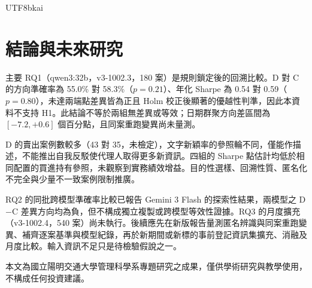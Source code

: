\documentclass[12pt,a4paper]{article}
\newcommand{\grp}[1]{\textsf{#1}}
\begin{document}
\begin{CJK}{UTF8}{bkai}
\section{結論與未來研究}
\label{sec:conclusion}

主要 RQ1（qwen3:32b，v3-1002.3，180 案）是規則鎖定後的回溯比較。\grp{D} 對 \grp{C} 的方向準確率為 55.0\% 對 58.3\%（$p=0.21$）、年化 Sharpe 為 0.54 對 0.59（$p=0.80$），未達兩端點差異皆為正且 Holm 校正後顯著的優越性判準，因此本資料不支持 H1。此結論不等於兩組無差異或等效；日期群聚方向差區間為 $[-7.2,+0.6]$ 個百分點，且同案重跑變異尚未量測。

\grp{D} 的賣出案例數較多（43 對 35，未檢定），文字新穎率的參照輪不同，僅能作描述，不能推出自我反駁使代理人取得更多新資訊。四組的 Sharpe 點估計均低於相同配置的買進持有參照，未觀察到實務績效增益。目的性選樣、回溯性質、匿名化不完全與少量不一致案例限制推廣。

RQ2 的同批跨模型準確率比較已報告 Gemini 3 Flash 的探索性結果，兩模型之 \grp{D}$-$\grp{C} 差異方向均為負，但不構成獨立複製或跨模型等效性證據。RQ3 的月度擴充（v3-1002.4，540 案）尚未執行。後續應先在新版報告量測匿名辨識與同案重跑變異、補齊逐案基準與模型紀錄，再於新期間或新標的事前登記資訊集擴充、消融及月度比較。輸入資訊不足只是待檢驗假說之一。

\vspace{0.8cm}
\noindent\small 本文為國立陽明交通大學管理科學系專題研究之成果，僅供學術研究與教學使用，不構成任何投資建議。
\normalsize

\clearpage



\clearpage
\end{CJK}
\end{document}
